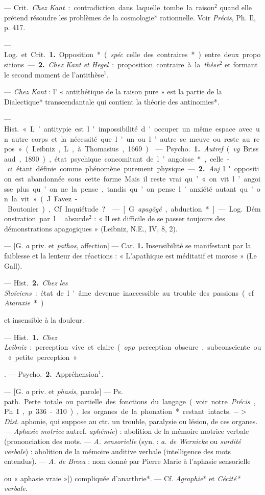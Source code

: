 \begin{itemize}[leftmargin=1cm, label=, itemsep=1pt]
{{{ — \si{Crit.} {\it Chez Kant} : contradiction
dans laquelle tombe la
raison$^2$ quand elle prétend résoudre
les problèmes de la cosmologie*
rationnelle. Voir {\it Précis}, Ph. Il,
p. 417.

 — \si{Log.} et \si{Crit.} {\bf 1.} Opposition*
({\it spéc}. celle des contraires*) entre
deux propositions. — {\bf 2.} {\it Chez Kant
et Hegel} : proposition contraire à la
{\it thèse}$^2$ et formant le second moment
de l’antithèse$^1$.

 — {\it Chez Kant} : l’ « antithétique de la raison pure » est la
partie de la Dialectique* transcendantale qui contient la théorie des
antinomies*.

 — \si{Hist.} « L’antitypie est
l'impossibilité d'occuper un même
espace avec un autre corps et la
nécessité que l’un ou l’autre se
meuve ou reste au repos » (Leibniz,
L, à Thomasius, 1669).

 — \si{Psycho.} {\bf 1.} {\it Autref}. ({\it vg}.
Brissaud, 1890), état psychique
concomitant de l’angoisse*, celle-ci
étant définie comme phénomène
purement physique. — {\bf 2.} {\it Auj}.
l'opposition est abandonnée sous
cette forme. Mais il reste vrai qu’ « on
vit l’angoisse plus qu’on ne la pense,
tandis qu’on pense l’anxiété autant
qu'on la vit » (J. Favez-Boutonier),
Cf. Inquiétude?.

 — [G. {\it apagôgé}, abduction*]
— \si{Log.} Démonstration par l'absurde$^2$ : « Il est
difficile de se passer toujours des
démonstrations apagogiques » (Leibniz, N.E., IV, 8, 2).

 — [G. {\it a} priv. et {\it pathos}, affection]
— Car. {\bf 1.} Insensibilité se
manifestant par la faiblesse et la
lenteur des réactions : « L’apathique
est méditatif et morose » (Le Gall).

— \si{Hist.} {\bf 2.} {\it Chez les Sloïciens} : état
de l'âme devenue inaccessible au
trouble des passions (cf. {\it Ataraxie}*)}
et insensible à la douleur.

 — \si{Hist.} {\bf 1.} {\it Chez Leibniz} :
perception vive et claire ({\it opp}. perception obscure, subconsciente ou
« petite perception »}. — \si{Psycho.}
 {\bf 2.} Appréhension$^1$.

 — [G. {\it a} priv. et {\it phasis}, parole]
— \si{Ps. path.} Perte totale ou partielle des fonctions du langage (voir
notre {\it Précis}, Ph. I, p. 336-310), les
organes de la phonation* restant
intacts. $->$ {\it Dist}. aphonie, qui suppose au ctr. un trouble, paralysie ou
lésion, de ces organes. — {\it Aphasie
motrice} {autref. {\it aphémie}) : abolition
de la mémoire motrice verbale (prononciation des mots}. — {\it A.
sensorielle} (syn. : {\it a. de Wernicke} ou {\it surdité verbale}) :
abolition de la mémoire
auditive verbale (intelligence des
mots entendus). — {\it A. de Broca} :
nom donné par Pierre Marie à
l'aphasie sensorielle {ou « aphasie
vraie »]) compliquée d’anarthrie*. —
Cf. {\it Agraphie}* et {\it Cécité* verbale}.

}}
\end{itemize}
